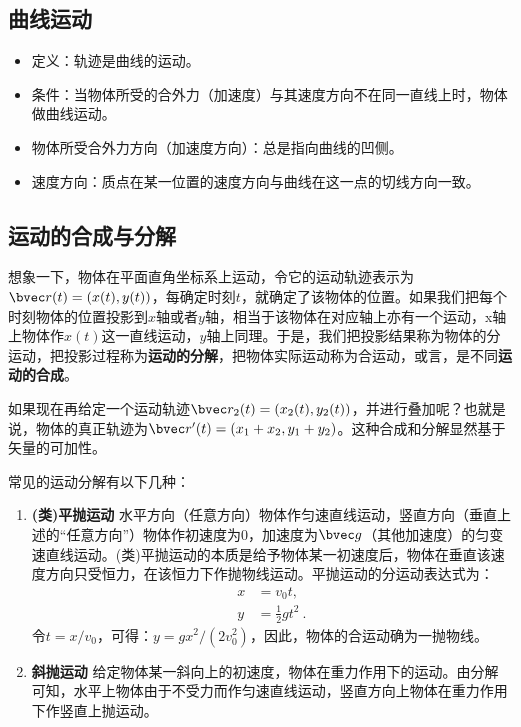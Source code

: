 

\subsection{曲线运动}

\begin{itemize}
\item 定义：轨迹是曲线的运动。
\item 条件：当物体所受的合外力（加速度）与其速度方向不在同一直线上时，物体做曲线运动。
\item 物体所受合外力方向（加速度方向）：总是指向曲线的凹侧。
\item 速度方向：质点在某一位置的速度方向与曲线在这一点的切线方向一致。
\end{itemize}

\subsection{运动的合成与分解}
想象一下，物体在平面直角坐标系上运动，令它的运动轨迹表示为$\bvec r(t)=(x(t),y(t))$，每确定时刻$t$，就确定了该物体的位置。如果我们把每个时刻物体的位置投影到$x$轴或者$y$轴，相当于该物体在对应轴上亦有一个运动，x轴上物体作$x(t)$这一直线运动，$y$轴上同理。于是，我们把投影结果称为物体的分运动，把投影过程称为\textbf{运动的分解}，把物体实际运动称为合运动，或言，是不同\textbf{运动的合成}。

如果现在再给定一个运动轨迹$\bvec r_2(t)=(x_2(t),y_2(t))$，并进行叠加呢？也就是说，物体的真正轨迹为$\bvec r'(t)=(x_1+x_2,y_1+y_2)$。这种合成和分解显然基于矢量的可加性。



常见的运动分解有以下几种：
\begin{enumerate}
\item \textbf{ (类)平抛运动} 水平方向（任意方向）物体作匀速直线运动，竖直方向（垂直上述的“任意方向”）物体作初速度为$0$，加速度为$\bvec g$（其他加速度）的匀变速直线运动。(类)平抛运动的本质是给予物体某一初速度后，物体在垂直该速度方向只受恒力，在该恒力下作抛物线运动。平抛运动的分运动表达式为：
\begin{equation}
\begin{aligned}
x&=v_0t,\\
y&=\frac{1}{2}gt^2~.
\end{aligned}
\end{equation} 令$t=x/v_0$，可得：$y=gx^2/(2v_0^2)$，因此，物体的合运动确为一抛物线。
\item \textbf{斜抛运动} 给定物体某一斜向上的初速度，物体在重力作用下的运动。由分解可知，水平上物体由于不受力而作匀速直线运动，竖直方向上物体在重力作用下作竖直上抛运动。
\end{enumerate}

